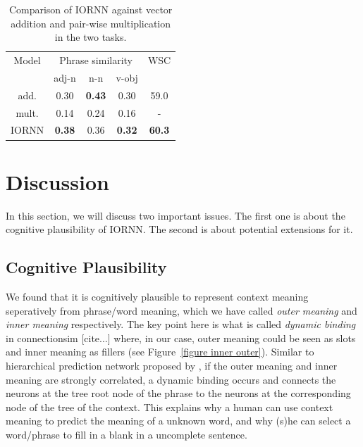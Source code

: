 \documentclass[11pt]{article}
\begin{document}
\begin{table}[!ht]
	\center
	\begin{tabular}{c|ccc|c}
	Model & \multicolumn{3}{c}{Phrase similarity} & WSC \\ 
	& adj-n & n-n & v-obj &  \\ \hline
	
	add. & 0.30 & \textbf{0.43} & 0.30 & 59.0\\ 
	mult. & 0.14 & 0.24 & 0.16 & - \\ 
	IORNN & \textbf{0.38} & 0.36 & \textbf{0.32} & \textbf{60.3} \\ \hline
	
	\end{tabular}
	\caption{Comparison of IORNN against vector addition and pair-wise multiplication
	in the two tasks.}
	\label{table summary}
\end{table}


\section{Discussion}
\label{section discussion}
In this section, we will discuss two important issues. The first one is about the cognitive 
plausibility of IORNN. The second is about potential extensions for it.

\subsection{Cognitive Plausibility}
\label{subsection cog plau}

We found that it is cognitively plausible to 
represent context meaning seperatively from phrase/word meaning, which we have called
\textit{outer meaning} and \textit{inner meaning} respectively. The key point here
is what is called \textit{dynamic binding} in connectionsim [cite...] where, in our case, 
outer meaning could be seen as slots and inner meaning as fillers (see Figure~\ref{figure inner outer}). 
Similar to hierarchical prediction network proposed by \cite{borensztajn2009hierarchical}, 
if the outer meaning and inner meaning are strongly correlated, a dynamic binding occurs
and connects the neurons at the tree root node of the phrase to the neurons at the 
corresponding node of the tree of the context. This explains why a human can use  
context meaning to predict the meaning of a unknown word, and why (s)he can select a word/phrase 
to fill in a blank in a uncomplete sentence.
\end{document}
